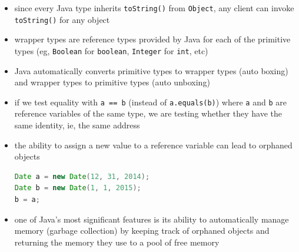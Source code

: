 \documentclass[8pt,a4paper,compress]{beamer}
\begin{document}
\begin{frame}[fragile]
\begin{itemize}
\item since every Java type inherits \lstinline{toString()} from \lstinline{Object}, any client can invoke \lstinline{toString()} for any object

\item wrapper types are reference types provided by Java for each of the primitive types (eg, \lstinline{Boolean} for \lstinline{boolean}, \lstinline{Integer} for \lstinline{int}, etc)

\item Java automatically converts primitive types to wrapper types (auto boxing) and wrapper types to primitive types (auto unboxing)

\item if we test equality with \lstinline{a == b} (instead of \lstinline{a.equals(b)}) where \lstinline{a} and \lstinline{b} are reference variables of the same type, we are testing whether they have the same identity, ie, the same address 

\item the ability to assign a new value to a reference variable can lead to orphaned objects
\begin{lstlisting}[language=Java]
Date a = new Date(12, 31, 2014);
Date b = new Date(1, 1, 2015);
b = a;
\end{lstlisting}

\item one of Java's most significant features is its ability to automatically manage memory (garbage collection) by keeping track of orphaned objects and returning the memory they use to a pool of free memory 
\end{itemize}
\end{frame}
\end{document}
